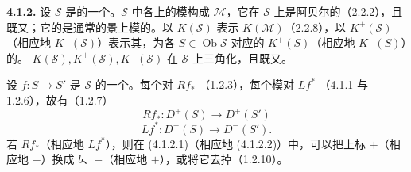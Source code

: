 \textbf{4.1.2.} 设 $\mathscr S$ 是的一个。$\mathscr S$ 中各上的模构成 $\mathscr M$，它在 $\mathscr S$ 上是阿贝尔的（2.2.2），且既又；它的是通常的景上模的。以 $K(\mathscr S)$ 表示 $K(\mathscr M)$（2.2.8），以 $K^+(\mathscr S)$（相应地 $K^-(\mathscr S)$）表示其，为各 $S\in\operatorname{Ob}\mathscr S$ 对应的 $K^+(S)$（相应地 $K^-(S)$）的。 $K(\mathscr S),K^+(\mathscr S),K^-(\mathscr S)$ 在 $\mathscr S$ 上三角化，且既又。

设 $f:S\to S'$ 是 $\mathscr S$ 的一个。每个对 $Rf_*$ （1.2.3），每个模对 $Lf^*$ （4.1.1 与 1.2.6），故有（1.2.7）
\[Rf_*:D^+(S)\longrightarrow D^+(S')\tag{4.1.2.1}\]
\[Lf^*:D^-(S)\longrightarrow D^-(S').\tag{4.1.2.2}\]
若 $Rf_*$（相应地 $Lf^*$），则在 (4.1.2.1)（相应地 (4.1.2.2)）中，可以把上标 $+$（相应地 $-$）换成 $b$、$-$（相应地 $+$），或将它去掉（1.2.10）。

